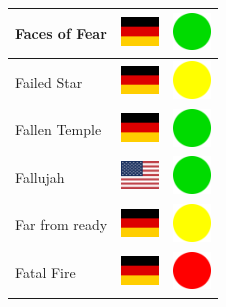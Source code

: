 \documentclass[12pt, a4paper, twoside]{report}
\begin{document}
\begin{center}
\begin{longtable}{|p{5cm}|p{2cm}|p{2cm}|}
 Faces of Fear                                              & \includegraphics[width=1cm]{../4x3/de} &   \includegraphics[width=1cm]{../likes/y} \\ \hline
 Failed Star                                                & \includegraphics[width=1cm]{../4x3/de} &   \includegraphics[width=1cm]{../likes/m} \\ \hline
 Fallen Temple                                              & \includegraphics[width=1cm]{../4x3/de} &   \includegraphics[width=1cm]{../likes/y} \\ \hline
 Fallujah                                                   & \includegraphics[width=1cm]{../4x3/us} &   \includegraphics[width=1cm]{../likes/y} \\ \hline
 Far from ready                                             & \includegraphics[width=1cm]{../4x3/de} &   \includegraphics[width=1cm]{../likes/m} \\ \hline
 Fatal Fire                                                 & \includegraphics[width=1cm]{../4x3/de} &   \includegraphics[width=1cm]{../likes/n} \\ \hline

\end{longtable}
\end{center}
\end{document}

